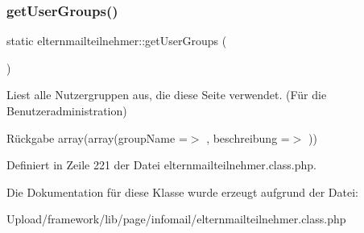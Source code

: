 \subsubsection{\texorpdfstring{get\+User\+Groups()}{getUserGroups()}}
{\footnotesize\ttfamily static elternmailteilnehmer\+::get\+User\+Groups (\begin{DoxyParamCaption}{ }\end{DoxyParamCaption})\hspace{0.3cm}{\ttfamily [static]}}

Liest alle Nutzergruppen aus, die diese Seite verwendet. (Für die Benutzeradministration) \begin{DoxyReturn}{Rückgabe}
array(array(\textquotesingle{}group\+Name\textquotesingle{} =$>$ \textquotesingle{}\textquotesingle{}, \textquotesingle{}beschreibung\textquotesingle{} =$>$ \textquotesingle{}\textquotesingle{})) 
\end{DoxyReturn}


Definiert in Zeile 221 der Datei elternmailteilnehmer.\+class.\+php.



Die Dokumentation für diese Klasse wurde erzeugt aufgrund der Datei\+:\begin{DoxyCompactItemize}
\item 
Upload/framework/lib/page/infomail/elternmailteilnehmer.\+class.\+php\end{DoxyCompactItemize}
